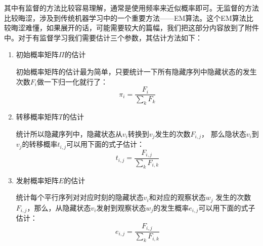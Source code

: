 \documentclass[twoside,a4paper,12pt]{book}%
\begin{document}
其中有监督的方法比较容易理解，通常是使用频率来近似概率即可。无监督的方法比较晦涩，涉及到传统机器学习中的一个重要方法——EM算法。这个EM算法比较晦涩难懂，如果展开的话，可能需要较大的篇幅，我们把这部分内容放到了附件中。对于有监督学习我们需要估计三个参数，其估计方法如下：
\begin{enumerate}
\item 初始概率矩阵$\Pi$的估计

初始概率矩阵的估计最为简单，只要统计一下所有隐藏序列中隐藏状态的发生次数$F_i$做一下归一化就行了：
$$
\pi_{i}=\frac{F_{i}}{\sum_{k}{F_{k}}}
$$
\item 转移概率矩阵$T$的估计

统计所以隐藏序列中，隐藏状态从$v_i$转换到$v_j$发生的次数$F_{i,j}$， 那么隐状态$v_i$到$v_j$的转移概率$
t_{i,j}$可以用下面的式子估计：
$$
t_{i,j}=\frac{F_{i,j}}{\sum_{k}{F_{i,k}}}
$$
\item 发射概率矩阵$E$的估计

统计每个平行序列对对应时刻的隐藏状态$v_i$和对应的观察状态$w_j$ 发生的次数$F_{i,j}$，那么，从隐藏状态$v_i$发射到观察状态$w_j$的发生概率$e_{i,j}$可以用下面的式子估计：
$$
e_{i,j}=\frac{F_{i,j}}{\sum_{k}{F_{i,k}}}
$$

\end{enumerate}
\end{document}
